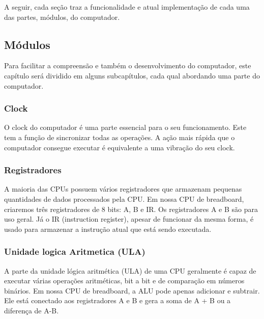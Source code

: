 A seguir, cada seção traz a funcionalidade e atual implementação de cada uma das partes, módulos, do computador.





\subsection{Módulos}
Para facilitar a compreensão e também o desenvolvimento do computador, este capítulo será dividido em alguns subcapítulos, cada qual abordando uma parte do computador.

\subsubsection{Clock}
O clock do computador é uma parte essencial para o seu funcionamento. Este tem a função de sincronizar todas as operações. A ação mais rápida que o computador consegue executar é equivalente a uma vibração do seu clock.

\subsubsection{Registradores}
A maioria das CPUs possuem vários registradores que armazenam pequenas quantidades de dados processados pela CPU. Em nossa CPU de breadboard, criaremos três registradores de 8 bits: A, B e IR. Os registradores A e B são para uso geral. Já o IR (instruction register), apesar de funcionar da mesma forma, é usado para armazenar a instrução atual que está sendo executada.

\subsubsection{Unidade logica Aritmetica  (ULA)}
A parte da unidade lógica aritmética (ULA) de uma CPU geralmente é capaz de executar várias operações aritméticas, bit a bit e de comparação em números binários. Em nossa CPU de breadboard, a ALU pode apenas adicionar e subtrair. Ele está conectado aos registradores A e B e gera a soma de A + B ou a diferença de A-B.

